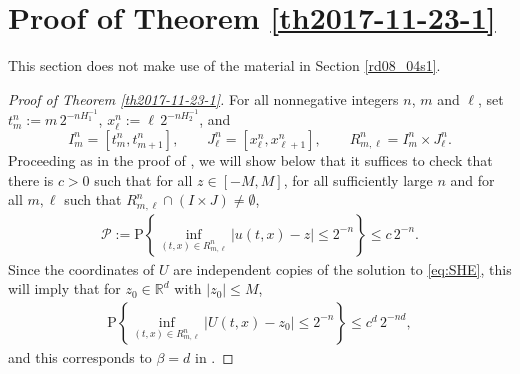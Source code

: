 \documentclass[12pt,a4paper]{article}
\newcommand{\R}{{\mathbb{R}}}
\renewcommand{\P}{\mathrm{P}}
\newcommand{\<}{\langle}
\renewcommand{\>}{\rangle}
\begin{document}
 
 
 
 
 \section{Proof of Theorem \ref{th2017-11-23-1}}\label{rd08_11s1}

This section does not make use of the material in Section \ref{rd08_04s1}.
 
\begin{proof}[Proof of Theorem \ref{th2017-11-23-1}]
For all nonnegative integers $n$, $m$ and $\ell$, set $t_m^n:=m\, 2^{-nH_1^{-1}}$, $x_{\ell}^n:=\ell\, 2^{-nH_2^{-1}}$,
and
\begin{equation*} %
	I^n_m = [t_m^n,t_{m+1}^n],\qquad J^n_{\ell} = [x_{\ell}^n,x_{\ell+1}^n],\qquad R^n_{m,\ell} = I^n_m \times J^n_{\ell}.
\end{equation*}
Proceeding as in the proof of \cite[Theorem 3.1]{DKN07}, we will show below that it suffices to check that there is $c > 0$ such that for all  $z\in [-M, M]$, for all sufficiently large $n$ and for all $m,\ell$ such that $R^n_{m,\ell} \cap  (I \times J) \neq \emptyset$,  
\begin{align}\label{eq:smallp}
         \mathcal{P}:= \P\left\{\inf_{(t,x)\in R^n_{m,\ell}} |u(t,x)-z|\leq 2^{-n} \right\} \leq c\, 2^{-n}.
\end{align}
Since the coordinates of $U$ are independent copies of the solution to \eqref{eq:SHE}, this will imply that for $z_0 \in \R^d$ with $\vert z_0 \vert \leq M$,
\begin{align}\label{rd04_01e3}
          \P\left\{\inf_{(t,x)\in R^n_{m,\ell}} |U(t,x)-z_0 |\leq 2^{-n} \right\} \leq c^d\, 2^{-nd},
\end{align}
and this corresponds to $\beta = d$ in \cite[Theorem 3.1]{DKN07}.


\end{proof}
\end{document}
